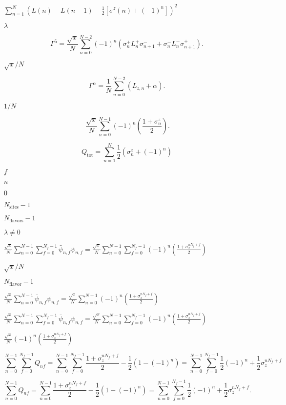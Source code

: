 \documentclass{article}
\begin{document}
{$ \sum_{n=1}^{N}\left(L(n)-L(n-1)-\frac{1}{2}\left[\sigma^z(n)+(-1)^n\right]\right)^2 $
\pagebreak

$ \lambda $
\pagebreak

\[ \Gamma^5 = \frac{\sqrt{x}}{N}\sum_{n=0}^{N-2}(-1)^n\left(\sigma_n^+L^+_n\sigma^-_{n+1} + \sigma_n^-L^-_n\sigma^+_{n+1} \right). \]
\pagebreak

$ \sqrt{x}/N $
\pagebreak

\[ \Gamma^\alpha = \frac{1}{N}\sum_{n=0}^{N-2}\left(L_{z,n}+\alpha \right). \]
\pagebreak

$ 1/N $
\pagebreak

\[ \ \frac{\sqrt{x}}{N}\sum_{n=0}^{N-1}(-1)^n\left(\frac{1+\sigma_n^z}{2}\right). \]
\pagebreak

\[ Q_\mathrm{tot}= \sum_{n=1}^{N} \frac{1}{2}\left(\sigma^z_n +(-1)^n\right) \]
\pagebreak

$ f $
\pagebreak

$ n $
\pagebreak

$ 0$
\pagebreak

$ N_\mathrm{sites}-1$
\pagebreak

$ N_\mathrm{flavors}-1$
\pagebreak

$ \lambda\neq 0 $
\pagebreak

$ \frac{\sqrt{x}}{N}\sum_{n=0}^{N-1}\sum_{f=0}^{N_f-1}\bar{\psi}_{n,f}\psi_{n,f}=\frac{\sqrt{x}}{N}\sum_{n=0}^{N-1}\sum_{f=0}^{N_f-1}(-1)^n\left(\frac{1+\sigma_z^{nN_f+f}}{2}\right) $
\pagebreak

$ \sqrt{x}/N$
\pagebreak

$ N_\mathrm{flavor} -1 $
\pagebreak

$ \frac{\sqrt{x}}{N}\sum_{n=0}^{N-1}\bar{\psi}_{n,f}\psi_{n,f}= \frac{\sqrt{x}}{N}\sum_{n=0}^{N-1}(-1)^n\left(\frac{1+\sigma_z^{nN_f+f}}{2}\right)$
\pagebreak

$ \frac{\sqrt{x}}{N}\sum_{n=0}^{N-1}\sum_{f=0}^{N_f-1}\bar{\psi}_{n,f}\psi_{n,f} = \frac{\sqrt{x}}{N}\sum_{n=0}^{N-1}\sum_{f=0}^{N_f-1}(-1)^n\left(\frac{1+\sigma_z^{nN_f+f}}{2}\right) $
\pagebreak

$ \frac{\sqrt{x}}{N}(-1)^n\left(\frac{1+\sigma_z^{nN_f+f}}{2}\right) $
\pagebreak

\[ \sum_{n=0}^{N-1} \sum_{f=0}^{N_f-1} Q_{nf} = \sum_{n=0}^{N-1} \sum_{f=0}^{N_f-1} \frac{1+\sigma_z^{nN_f+f}}{2}-\frac{1}{2}\left(1-(-1)^n\right) = \sum_{n=0}^{N-1} \sum_{f=0}^{N_f-1} \frac{1}{2}\left(-1\right)^n+\frac{1}{2}\sigma_z^{nN_f+f} \]
\pagebreak

\[ \sum_{n=0}^{N-1} Q_{nf} = \sum_{n=0}^{N-1} \frac{1+\sigma_z^{nN_f+f}}{2}-\frac{1}{2}\left(1-(-1)^n\right) = \sum_{n=0}^{N-1} \sum_{f=0}^{N_f-1} \frac{1}{2}\left(-1\right)^n+\frac{1}{2}\sigma_z^{nN_f+f}. \]
\pagebreak

}
\end{document}
